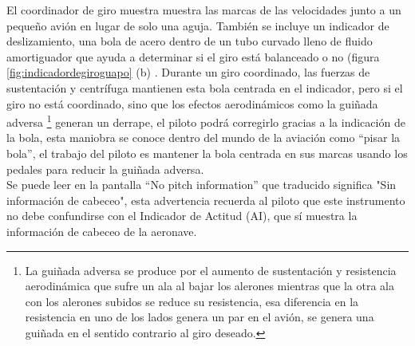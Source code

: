 El coordinador de giro muestra muestra las marcas de las velocidades junto a un pequeño avión en lugar de solo una aguja. También se incluye un indicador de deslizamiento, una bola de acero dentro de un tubo curvado lleno de fluido amortiguador que ayuda a determinar si el giro está balanceado o no (figura \ref{fig:indicadordegiroguapo} (b) . Durante un giro coordinado, las fuerzas de sustentación y centrífuga mantienen esta bola centrada en el indicador, pero si el giro no está coordinado, sino que los efectos aerodinámicos como la guiñada adversa \footnote{La guiñada adversa se produce por el aumento de sustentación y resistencia aerodinámica que sufre un ala al bajar los alerones mientras que la otra ala con los alerones subidos se reduce su resistencia, esa diferencia en la resistencia en uno de los lados genera un par en el avión, se genera una guiñada en el sentido contrario al giro deseado. } generan un derrape, el piloto podrá corregirlo gracias a la indicación de la bola, esta maniobra se conoce dentro del mundo de la aviación como ``pisar la bola'', el trabajo del piloto es mantener la bola centrada en sus marcas usando los pedales para reducir la guiñada adversa.\\

Se puede leer en la pantalla ``No pitch information'' que traducido significa "Sin información de cabeceo", esta advertencia recuerda al piloto que este instrumento no debe confundirse con el Indicador de Actitud (AI), que sí muestra la información de cabeceo de la aeronave.









